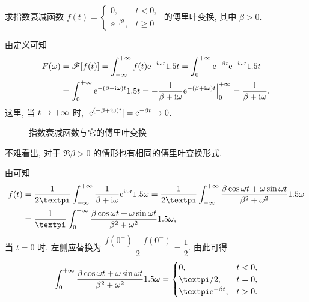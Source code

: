 \begin{example}\label{exam:fourier-transform-exponential-decay}
  求指数衰减函数 $f(t)=\begin{cases}
    0,&t<0,\\
    \ee^{-\beta t},&t\ge 0
  \end{cases}$ 的傅里叶变换, 其中 $\beta>0$.
\end{example}

\begin{solution}
  由定义可知
  \begin{align*}
    F(\omega)&=\mathscr{F}[f(t)]=\displaystyle\int_{-\infty}^{+\infty} f(t)\mathrm{e}^{-\mathrm{i} \omega t}1.5 t
    =\displaystyle\int_0^{+\infty}\mathrm{e}^{-\beta t}\mathrm{e}^{-\mathrm{i} \omega t}1.5 t\\
    &=\displaystyle\int_0^{+\infty}\mathrm{e}^{-(\beta+\mathrm{i} \omega)t}1.5 t
    =-\frac1{\beta+\mathrm{i} \omega}\mathrm{e}^{-(\beta+\mathrm{i} \omega)t}\Big|_0^{+\infty}
    =\frac1{\beta+\mathrm{i} \omega}.
  \end{align*}
  这里, 当 $t\rightarrow +\infty$ 时, $\lvert\mathrm{e}^{(-\beta+\mathrm{i} \omega)t}\rvert=\mathrm{e}^{-\beta t}\rightarrow 0$.
\end{solution}

\begin{figure}[H]
  \centering
  \caption{指数衰减函数与它的傅里叶变换}
\end{figure}

不难看出, 对于 $\Re\beta>0$ 的情形也有相同的傅里叶变换形式.

由\thmFI 可知
\begin{align*}
    f(t)
  &=\frac1{2\cpi}\intff \frac1{\beta+\ii \omega}\ee^{\ii \omega t}\d \omega
   =\frac1{2\cpi}\intff \frac{\beta\cos\omega t+\omega\sin\omega t}{\beta^2+\omega^2}\d \omega\\
  &=\frac1{\cpi}\intf \frac{\beta\cos\omega t+\omega\sin\omega t}{\beta^2+\omega^2}\d \omega,
\end{align*}
当 $t=0$ 时, 左侧应替换为 $\dfrac{f(0^+)+f(0^-)}2=\dfrac12$.
由此可得
\[
  \intf\frac{\beta\cos\omega t+\omega\sin\omega t}{\beta^2+\omega^2}\d\omega
  =\begin{cases}
    0,&t<0,\\
    \cpi/2,&t=0,\\
    \cpi \ee^{-\beta t},&t>0.
  \end{cases}
\]

